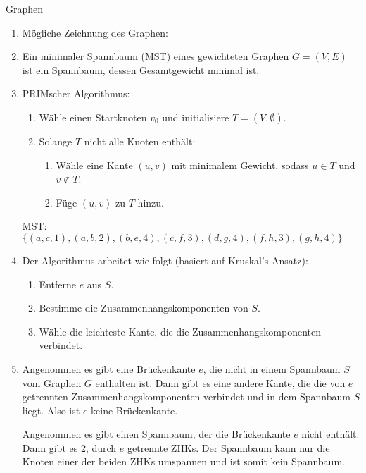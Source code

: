 \documentclass{article}
\begin{document}
\begin{exercise}{Graphen}
  \begin{solution}
    \begin{enumerate}
      \item Mögliche Zeichnung des Graphen:
      \item Ein minimaler Spannbaum (MST) eines gewichteten Graphen $G = (V, E)$ ist ein Spannbaum, dessen Gesamtgewicht minimal ist.
      \item PRIMscher Algorithmus:
            \begin{enumerate}
              \item Wähle einen Startknoten $v_0$ und initialisiere $T = (V, \emptyset)$.
              \item Solange $T$ nicht alle Knoten enthält:
                    \begin{enumerate}
                      \item Wähle eine Kante $(u, v)$ mit minimalem Gewicht, sodass $u \in T$ und $v \notin T$.
                      \item Füge $(u, v)$ zu $T$ hinzu.
                    \end{enumerate}
            \end{enumerate}
            MST: $\{(a,c,1),(a,b,2),(b,e,4),(c,f,3),(d,g,4),(f,h,3),(g,h,4)\}$
      \item Der Algorithmus arbeitet wie folgt (basiert auf Kruskal's Ansatz):
            \begin{enumerate}
              \item Entferne $e$ aus $S$.
              \item Bestimme die Zusammenhangskomponenten von $S$.
              \item Wähle die leichteste Kante, die die Zusammenhangskomponenten verbindet.
            \end{enumerate}
      \item Angenommen es gibt eine Brückenkante $e$, die nicht in einem Spannbaum $S$ vom Graphen $G$ enthalten ist. Dann gibt es eine andere Kante, die die von $e$ getrennten Zusammenhangskomponenten verbindet und in dem Spannbaum $S$ liegt. Also ist $e$ keine Brückenkante.\par
            Angenommen es gibt einen Spannbaum, der die Brückenkante $e$ nicht enthält. Dann gibt es 2, durch $e$ getrennte ZHKs. Der Spannbaum kann nur die Knoten einer der beiden ZHKs umspannen und ist somit kein Spannbaum.
    \end{enumerate}
  \end{solution}
\end{exercise}
\end{document}

